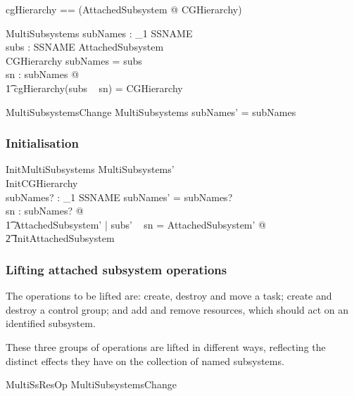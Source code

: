 \documentclass[a4paper,twoside,12pt]{article}
\begin{document}
\begin{zed}
cgHierarchy == (\lambda AttachedSubsystem @ \theta CGHierarchy) 
\end{zed}


\begin{schema}{MultiSubsystems}
subNames : \finset_1 SSNAME \\
subs : SSNAME \ffun AttachedSubsystem \\
CGHierarchy
\where
subNames = \dom subs \\
\forall sn : subNames @ \\
    \t1 cgHierarchy(subs ~ sn) = \theta CGHierarchy
\end{schema}

\begin{schema}{MultiSubsystemsChange}
\Delta MultiSubsystems
\where
subNames' = subNames
\end{schema}

\subsubsection{Initialisation}

\begin{schema}{InitMultiSubsystems}
MultiSubsystems' \\
InitCGHierarchy \\
subNames? : \finset_1 SSNAME 
\where
subNames' = subNames? \\
\forall sn : subNames? @ \\
\t1 \exists AttachedSubsystem' | subs' ~ sn = \theta AttachedSubsystem' @ \\
    \t2 InitAttachedSubsystem
\end{schema}


\subsubsection{Lifting attached subsystem operations}

The operations to be lifted are: create,  destroy and move a task;
create and destroy a control group; and add and remove resources, which should act on an 
identified subsystem.

These three groups of operations are lifted in different ways, reflecting the distinct effects they have on the 
collection of named subsystems.

\begin{schema}{MultiSsResOp}
MultiSubsystemsChange \\

\end{schema}
\end{document}

